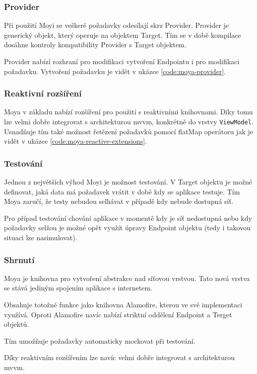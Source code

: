 \subsubsection*{Provider}

Při použití Moyi se veškeré požadavky odesílají skrz Provider.
Provider je generický objekt, který operuje na objektem Target.
Tím se v době kompilace dosáhne kontroly kompatibility Provider s Target objektem.

Provider nabízí rozhraní pro modifikaci vytvoření Endpointu i pro modifikaci požadavku.
Vytvoření požadavku je vidět v ukázce \ref{code:moya-provider}.


\subsubsection*{Reaktivní rozšíření}

Moya v základu nabízí rozšíření pro použití s reaktivními knihovnami.
Díky tomu lze velmi dobře integrovat s architekturou \acrshort{mvvm}, konkrétně do vrstvy \texttt{ViewModel}.
Usnadňuje tím také možnost řetězení požadavků pomocí flatMap operátoru jak je vidět v ukázce \ref{code:moya-reactive-extensions}.


\subsubsection*{Testování}

Jednou z největších výhod Moyi je možnost testování.
V Target objektu je možné definovat, jaká data má požadavek vrátit v době kdy se aplikace testuje.
Tím Moya zaručí, že testy nebudou selhávat v případě kdy nebude dostupná síť.

Pro případ testování chování aplikace v momentě kdy je síť nedostupná nebo kdy požadavky selžou je možné opět využít úpravy Endpoint objektu (tedy i takovou situaci lze nasimulovat).

\subsubsection*{Shrnutí}

Moya je knihovna pro vytvoření abstrakce nad síťovou vrstvou.
Tato nová vrstva se stává jediným spojením aplikace s internetem.

Obsahuje totožné funkce jako knihovna Alamofire, kterou ve své implementaci využívá.
Oproti Alamofire navíc nabízí striktní oddělení Endpoint a Terget objektů.

Tím umožňuje požadavky automaticky mockovat při testování.

Díky reaktivním rozšířením lze navíc velmi dobře integrovat s architekturou \acrshort{mvvm}.
